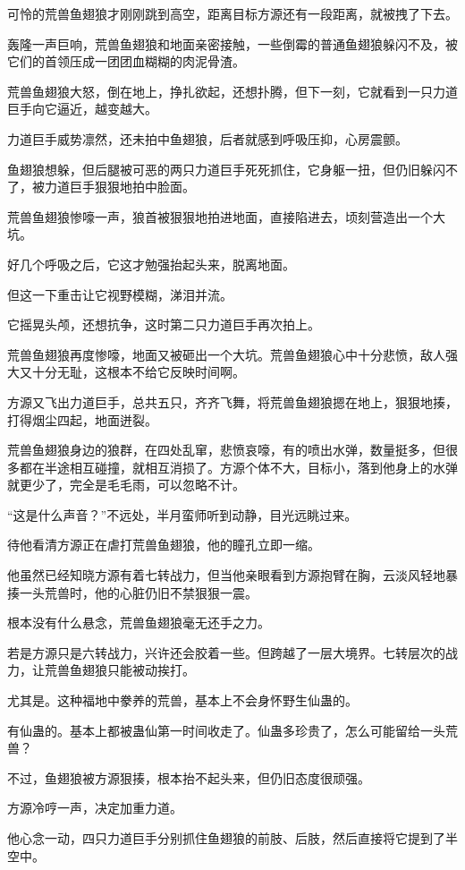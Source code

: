 \begin{this_body}
可怜的荒兽鱼翅狼才刚刚跳到高空，距离目标方源还有一段距离，就被拽了下去。

轰隆一声巨响，荒兽鱼翅狼和地面亲密接触，一些倒霉的普通鱼翅狼躲闪不及，被它们的首领压成一团团血糊糊的肉泥骨渣。

荒兽鱼翅狼大怒，倒在地上，挣扎欲起，还想扑腾，但下一刻，它就看到一只力道巨手向它逼近，越变越大。

力道巨手威势凛然，还未拍中鱼翅狼，后者就感到呼吸压抑，心房震颤。

鱼翅狼想躲，但后腿被可恶的两只力道巨手死死抓住，它身躯一扭，但仍旧躲闪不了，被力道巨手狠狠地拍中脸面。

荒兽鱼翅狼惨嚎一声，狼首被狠狠地拍进地面，直接陷进去，顷刻营造出一个大坑。

好几个呼吸之后，它这才勉强抬起头来，脱离地面。

但这一下重击让它视野模糊，涕泪并流。

它摇晃头颅，还想抗争，这时第二只力道巨手再次拍上。

荒兽鱼翅狼再度惨嚎，地面又被砸出一个大坑。荒兽鱼翅狼心中十分悲愤，敌人强大又十分无耻，这根本不给它反映时间啊。

方源又飞出力道巨手，总共五只，齐齐飞舞，将荒兽鱼翅狼摁在地上，狠狠地揍，打得烟尘四起，地面迸裂。

荒兽鱼翅狼身边的狼群，在四处乱窜，悲愤哀嚎，有的喷出水弹，数量挺多，但很多都在半途相互碰撞，就相互消损了。方源个体不大，目标小，落到他身上的水弹就更少了，完全是毛毛雨，可以忽略不计。

“这是什么声音？”不远处，半月蛮师听到动静，目光远眺过来。

待他看清方源正在虐打荒兽鱼翅狼，他的瞳孔立即一缩。

他虽然已经知晓方源有着七转战力，但当他亲眼看到方源抱臂在胸，云淡风轻地暴揍一头荒兽时，他的心脏仍旧不禁狠狠一震。

根本没有什么悬念，荒兽鱼翅狼毫无还手之力。

若是方源只是六转战力，兴许还会胶着一些。但跨越了一层大境界。七转层次的战力，让荒兽鱼翅狼只能被动挨打。

尤其是。这种福地中豢养的荒兽，基本上不会身怀野生仙蛊的。

有仙蛊的。基本上都被蛊仙第一时间收走了。仙蛊多珍贵了，怎么可能留给一头荒兽？

不过，鱼翅狼被方源狠揍，根本抬不起头来，但仍旧态度很顽强。

方源冷哼一声，决定加重力道。

他心念一动，四只力道巨手分别抓住鱼翅狼的前肢、后肢，然后直接将它提到了半空中。


\end{this_body}
